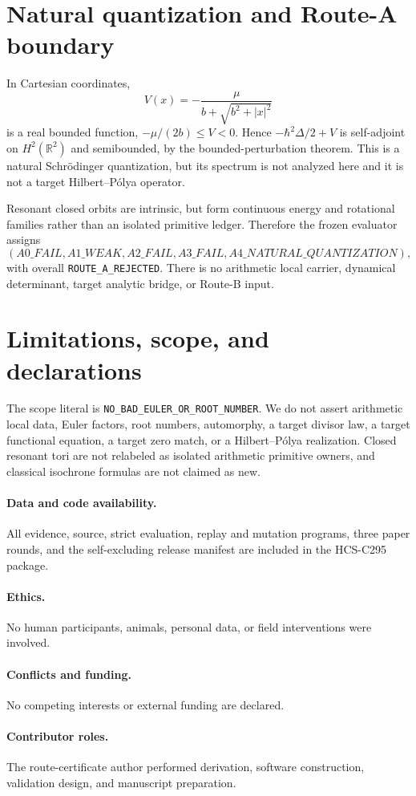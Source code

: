 \documentclass[10pt]{article}
\newcommand{\R}{\mathbb R}
\newcommand{\abs}[1]{\lvert#1\rvert}
\begin{document}
\section{Natural quantization and Route-A boundary}
In Cartesian coordinates,
\[
 V(x)=-\frac{\mu}{b+\sqrt{b^2+\abs x^2}}
\]
is a real bounded function, \(-\mu/(2b)\leq V<0\).  Hence
\(-\hbar^2\Delta/2+V\) is self-adjoint on \(H^2(\R^2)\) and semibounded,
by the bounded-perturbation theorem.  This is a natural Schr\"odinger
quantization, but its spectrum is not analyzed here and it is not a target
Hilbert--P\'olya operator.

Resonant closed orbits are intrinsic, but form continuous energy and
rotational families rather than an isolated primitive ledger.  Therefore
the frozen evaluator assigns
\[
 (A0\_FAIL,A1\_WEAK,A2\_FAIL,A3\_FAIL,
 A4\_NATURAL\_QUANTIZATION),
\]
with overall \texttt{ROUTE\_A\_REJECTED}.  There is no arithmetic local
carrier, dynamical determinant, target analytic bridge, or Route-B input.

\section{Limitations, scope, and declarations}
The scope literal is \texttt{NO\_BAD\_EULER\_OR\_ROOT\_NUMBER}.  We do not
assert arithmetic local data, Euler factors, root numbers, automorphy, a
target divisor law, a target functional equation, a target zero match, or a
Hilbert--P\'olya realization.  Closed resonant tori are not relabeled as
isolated arithmetic primitive owners, and classical isochrone formulas are
not claimed as new.

\paragraph{Data and code availability.}
All evidence, source, strict evaluation, replay and mutation programs, three
paper rounds, and the self-excluding release manifest are included in the
HCS-C295 package.
\paragraph{Ethics.}
No human participants, animals, personal data, or field interventions were
involved.
\paragraph{Conflicts and funding.}
No competing interests or external funding are declared.
\paragraph{Contributor roles.}
The route-certificate author performed derivation, software construction,
validation design, and manuscript preparation.
\end{document}
